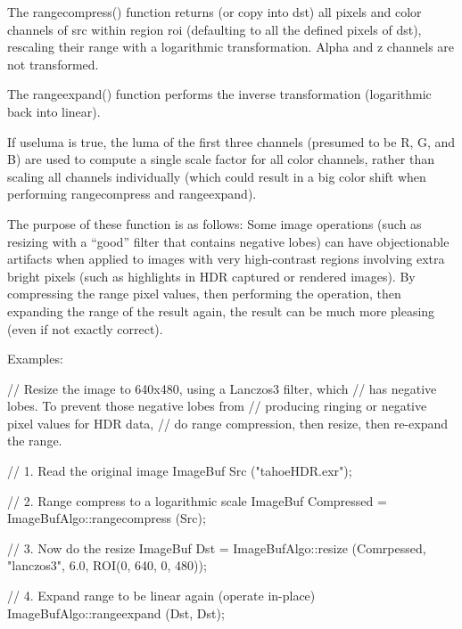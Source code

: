 The {\cf rangecompress()} function returns (or copy into dst) all pixels and
color channels of {\cf src} within region {\cf roi} (defaulting to all the
defined pixels of {\cf dst}), rescaling their range with a logarithmic
transformation. Alpha and z channels are not transformed.

The {\cf rangeexpand()} function performs the inverse transformation
(logarithmic back into linear).

If {\cf useluma} is true, the luma of the first three channels (presumed
to be R, G, and B) are used to compute a single scale factor for all
color channels, rather than scaling all channels individually (which
could result in a big color shift when performing {\cf rangecompress}
and {\cf rangeexpand}).

The purpose of these function is as follows: Some image operations (such
as resizing with a ``good'' filter that contains negative lobes) can have
objectionable artifacts when applied to images with very high-contrast
regions involving extra bright pixels (such as highlights in HDR
captured or rendered images).  By compressing the range pixel values,
then performing the operation, then expanding the range of the result
again, the result can be much more pleasing (even if not exactly
correct).

\smallskip
\noindent Examples:
\begin{code}
    // Resize the image to 640x480, using a Lanczos3 filter, which
    // has negative lobes. To prevent those negative lobes from
    // producing ringing or negative pixel values for HDR data,
    // do range compression, then resize, then re-expand the range.

    // 1. Read the original image
    ImageBuf Src ("tahoeHDR.exr");

    // 2. Range compress to a logarithmic scale
    ImageBuf Compressed = ImageBufAlgo::rangecompress (Src);

    // 3. Now do the resize
    ImageBuf Dst = ImageBufAlgo::resize (Comrpessed, "lanczos3", 6.0,
                                         ROI(0, 640, 0, 480));

    // 4. Expand range to be linear again (operate in-place)
    ImageBufAlgo::rangeexpand (Dst, Dst);
\end{code}
\apiend


 

